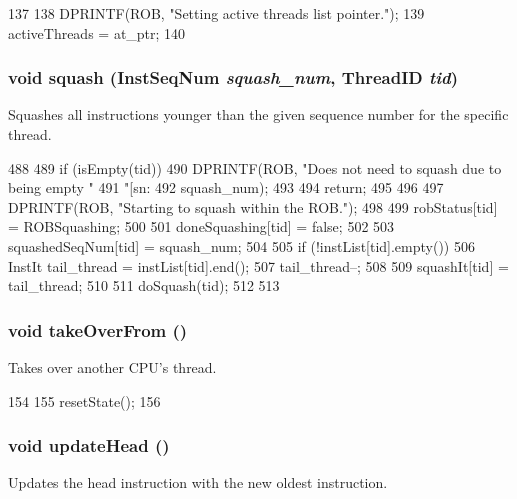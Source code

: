 \begin{DoxyCode}
137 {
138     DPRINTF(ROB, "Setting active threads list pointer.\n");
139     activeThreads = at_ptr;
140 }
\end{DoxyCode}
\hypertarget{classROB_aee9dc23de90acd20200641407a3bd1da}{
\subsubsection[{squash}]{\setlength{\rightskip}{0pt plus 5cm}void squash ({\bf InstSeqNum} {\em squash\_\-num}, \/  {\bf ThreadID} {\em tid})}}
\label{classROB_aee9dc23de90acd20200641407a3bd1da}
Squashes all instructions younger than the given sequence number for the specific thread. 


\begin{DoxyCode}
488 {
489     if (isEmpty(tid)) {
490         DPRINTF(ROB, "Does not need to squash due to being empty "
491                 "[sn:%
492                 squash_num);
493 
494         return;
495     }
496 
497     DPRINTF(ROB, "Starting to squash within the ROB.\n");
498 
499     robStatus[tid] = ROBSquashing;
500 
501     doneSquashing[tid] = false;
502 
503     squashedSeqNum[tid] = squash_num;
504 
505     if (!instList[tid].empty()) {
506         InstIt tail_thread = instList[tid].end();
507         tail_thread--;
508 
509         squashIt[tid] = tail_thread;
510 
511         doSquash(tid);
512     }
513 }
\end{DoxyCode}
\hypertarget{classROB_a8674059ce345e23aac5086b2c3e24a43}{
\subsubsection[{takeOverFrom}]{\setlength{\rightskip}{0pt plus 5cm}void takeOverFrom ()}}
\label{classROB_a8674059ce345e23aac5086b2c3e24a43}
Takes over another CPU's thread. 


\begin{DoxyCode}
154 {
155     resetState();
156 }
\end{DoxyCode}
\hypertarget{classROB_a5284fa5ccee18ce965fb4863722e96a9}{
\subsubsection[{updateHead}]{\setlength{\rightskip}{0pt plus 5cm}void updateHead ()}}
\label{classROB_a5284fa5ccee18ce965fb4863722e96a9}
Updates the head instruction with the new oldest instruction. 


